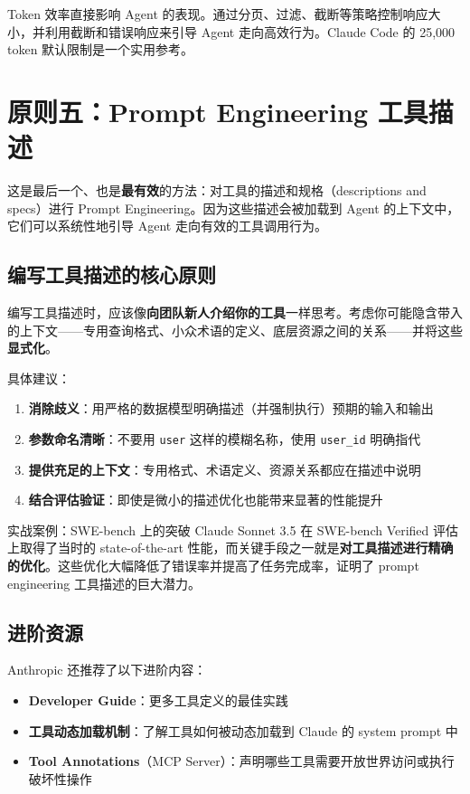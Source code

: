 \documentclass[a4paper]{article}
\begin{document}
Token 效率直接影响 Agent 的表现。通过分页、过滤、截断等策略控制响应大小，并利用截断和错误响应来引导 Agent 走向高效行为。Claude Code 的 25,000 token 默认限制是一个实用参考。


\section{原则五：Prompt Engineering 工具描述}

这是最后一个、也是\textbf{最有效}的方法：对工具的描述和规格（descriptions and specs）进行 Prompt Engineering。因为这些描述会被加载到 Agent 的上下文中，它们可以系统性地引导 Agent 走向有效的工具调用行为。

\subsection{编写工具描述的核心原则}

编写工具描述时，应该像\textbf{向团队新人介绍你的工具}一样思考。考虑你可能隐含带入的上下文——专用查询格式、小众术语的定义、底层资源之间的关系——并将这些\textbf{显式化}。

具体建议：

\begin{enumerate}[leftmargin=1.5em]
    \item \textbf{消除歧义}：用严格的数据模型明确描述（并强制执行）预期的输入和输出
    \item \textbf{参数命名清晰}：不要用 \texttt{user} 这样的模糊名称，使用 \texttt{user\_id} 明确指代
    \item \textbf{提供充足的上下文}：专用格式、术语定义、资源关系都应在描述中说明
    \item \textbf{结合评估验证}：即使是微小的描述优化也能带来显著的性能提升
\end{enumerate}

\begin{importantbox}{实战案例：SWE-bench 上的突破}
Claude Sonnet 3.5 在 SWE-bench Verified 评估上取得了当时的 state-of-the-art 性能，而关键手段之一就是\textbf{对工具描述进行精确的优化}。这些优化大幅降低了错误率并提高了任务完成率，证明了 prompt engineering 工具描述的巨大潜力。
\end{importantbox}

\subsection{进阶资源}

Anthropic 还推荐了以下进阶内容：

\begin{itemize}[leftmargin=1.5em]
    \item \textbf{Developer Guide}：更多工具定义的最佳实践
    \item \textbf{工具动态加载机制}：了解工具如何被动态加载到 Claude 的 system prompt 中
    \item \textbf{Tool Annotations}（MCP Server）：声明哪些工具需要开放世界访问或执行破坏性操作
\end{itemize}
\end{document}
